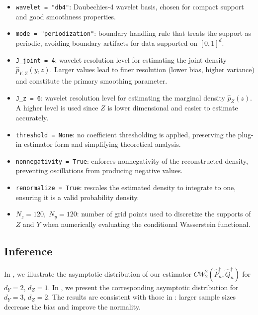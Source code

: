 \documentclass{article}
\theoremstyle{plain}
\theoremstyle{definition}
\def\PP{P}
\def\QQ{Q}
\theoremstyle{plain}
\newcommand{\Cwass}{{CW}}
\begin{document}
\begin{itemize}
    \item \texttt{wavelet = "db4"}: Daubechies-4 wavelet basis, chosen for compact support and good smoothness properties.

    \item \texttt{mode = "periodization"}: boundary handling rule that treats the support as periodic, avoiding boundary artifacts for data supported on $[0,1]^d$.

    \item \texttt{J\_joint = 4}: wavelet resolution level for estimating the joint density $\widehat p_{Y,Z}(y,z)$. 
    Larger values lead to finer resolution (lower bias, higher variance) and constitute the primary smoothing parameter.

    \item \texttt{J\_z = 6}: wavelet resolution level for estimating the marginal density $\widehat p_Z(z)$. 
    A higher level is used since $Z$ is lower dimensional and easier to estimate accurately.
    
    \item \texttt{threshold = None}: no coefficient thresholding is applied, preserving the plug-in estimator form and simplifying theoretical analysis.

    \item \texttt{nonnegativity = True}: enforces nonnegativity of the reconstructed density, preventing oscillations from producing negative values.

    \item \texttt{renormalize = True}: rescales the estimated density to integrate to one, ensuring it is a valid probability density.

     \item $N_z = 120,\; N_y = 120$: number of grid points used to discretize the supports of $Z$ and $Y$ when numerically evaluating the conditional Wasserstein functional.
\end{itemize}



\subsection{Inference}\label{appe:sec:numerical.experiment.inference}

In , we illustrate the asymptotic distribution of our estimator 
$\Cwass_2^2(\widehat{\PP}_n^\dagger,\widehat{\QQ}_n^\dagger)$ for $d_Y=2$, $d_Z=1$. 
In , we present the corresponding asymptotic distribution for $d_Y=3$, $d_Z=2$.
The results are consistent with those in : larger sample sizes decrease the bias and improve the normality.
\end{document}
